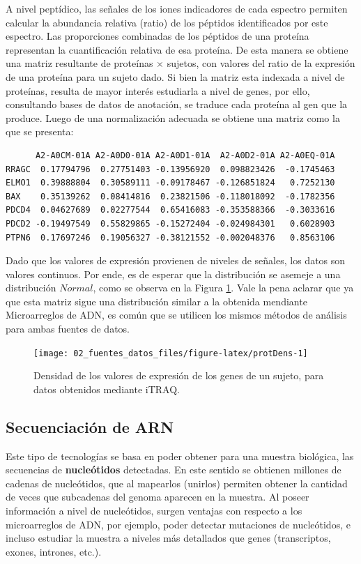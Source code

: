 \documentclass[12pt,twoside]{reedthesis}
\begin{document}
A nivel peptídico, las señales de los iones indicadores de cada espectro permiten calcular la abundancia relativa (ratio) de los péptidos identificados por este espectro. Las proporciones combinadas de los péptidos de una proteína representan la cuantificación relativa de esa proteína. De esta manera se obtiene una matriz resultante de proteínas \(\times\) sujetos, con valores del ratio de la expresión de una proteína para un sujeto dado. Si bien la matriz esta indexada a nivel de proteínas, resulta de mayor interés estudiarla a nivel de genes, por ello, consultando bases de datos de anotación, se traduce cada proteína al gen que la produce. Luego de una normalización adecuada se obtiene una matriz como la que se presenta:
\begin{verbatim}
      A2-A0CM-01A A2-A0D0-01A A2-A0D1-01A  A2-A0D2-01A A2-A0EQ-01A
RRAGC  0.17794796  0.27751403 -0.13956920  0.098823426  -0.1745463
ELMO1  0.39888804  0.30589111 -0.09178467 -0.126851824   0.7252130
BAX    0.35139262  0.08414816  0.23821506 -0.118018092  -0.1782356
PDCD4  0.04627689  0.02277544  0.65416083 -0.353588366  -0.3033616
PDCD2 -0.19497549  0.55829865 -0.15272404 -0.024984301   0.6028903
PTPN6  0.17697246  0.19056327 -0.38121552 -0.002048376   0.8563106
\end{verbatim}
Dado que los valores de expresión provienen de niveles de señales, los datos son valores continuos. Por ende, es de esperar que la distribución se asemeje a una distribución \(Normal\), como se observa en la Figura \ref{fig:protDens}. Vale la pena aclarar que ya que esta matriz sigue una distribución similar a la obtenida mendiante Microarreglos de ADN, es común que se utilicen los mismos métodos de análisis para ambas fuentes de datos.
\begin{figure}

{\centering \texttt{[image: 02\_fuentes\_datos\_files/figure-latex/protDens-1]} 

}

\caption{Densidad de los valores de expresión de los genes de un sujeto, para datos obtenidos mediante iTRAQ.}\label{fig:protDens}
\end{figure}
\hypertarget{secuenciacion-de-arn}{%
\subsection{Secuenciación de ARN}\label{secuenciacion-de-arn}}

Este tipo de tecnologías se basa en poder obtener para una muestra biológica, las secuencias de \textbf{nucleótidos} detectadas. En este sentido se obtienen millones de cadenas de nucleótidos, que al mapearlos (unirlos) permiten obtener la cantidad de veces que subcadenas del genoma aparecen en la muestra. Al poseer información a nivel de nucleótidos, surgen ventajas con respecto a los microarreglos de ADN, por ejemplo, poder detectar mutaciones de nucleótidos, e incluso estudiar la muestra a niveles más detallados que genes (transcriptos, exones, intrones, etc.).
\end{document}
